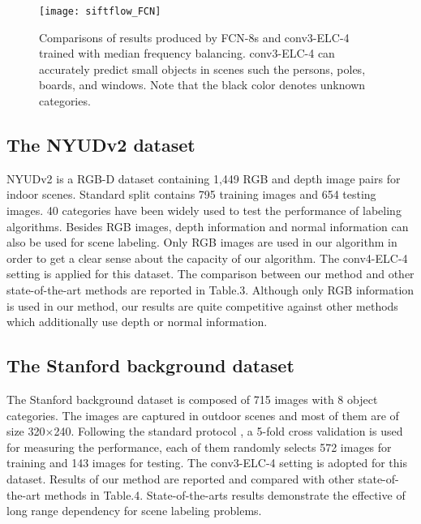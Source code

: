 \documentclass[10pt,twocolumn,letterpaper]{article}
\begin{document}
\begin{figure}
\begin{center}
   \texttt{[image: siftflow\_FCN]}
\end{center}
   \caption{Comparisons of results produced by FCN-8s \cite{3} and conv3-ELC-4 trained with median frequency balancing. conv3-ELC-4 can accurately predict small objects in scenes such the persons, poles, boards, and windows. Note that the black color denotes unknown categories.}
\label{fig:siftflow}
\end{figure}



\subsection{The NYUDv2 dataset}
NYUDv2 is a RGB-D dataset containing 1,449 RGB and depth image pairs for indoor scenes. Standard split contains 795 training images and 654 testing images. 40 categories \cite{38} have been widely used to test the performance of labeling algorithms. Besides RGB images, depth information \cite{3,39} and normal information \cite{2} can also be used for scene labeling. Only RGB images are used in our algorithm in order to get a clear sense about the capacity of our algorithm. The conv4-ELC-4 setting is applied for this dataset. The comparison between our method and other state-of-the-art methods are reported in Table.3. Although only RGB information is used in our method, our results are quite competitive against other methods which additionally use depth or normal information.




\subsection{The Stanford background dataset}
The Stanford background dataset is composed of 715 images with 8 object categories. The images are captured in outdoor scenes and most of them are of size 320$\times$240. Following the standard protocol \cite{36}, a 5-fold cross validation is used for measuring the performance, each of them randomly selects 572 images for training and 143 images for testing. The conv3-ELC-4 setting is adopted for this dataset. Results of our method are reported and compared with other state-of-the-art methods in Table.4. State-of-the-arts results demonstrate the effective of long range dependency for scene labeling problems.
\end{document}
